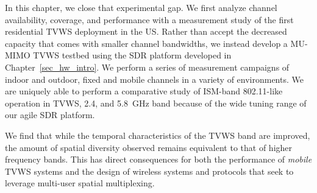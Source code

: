 	In this chapter, we close that experimental gap.
	We first analyze channel availability, coverage, and performance with a measurement study of the first residential \ac{TVWS} deployment in the US.
	Rather than accept the decreased capacity that comes with smaller channel bandwidths, we instead develop a \ac{MU-MIMO} \ac{TVWS} testbed using the \ac{SDR} platform developed in Chapter~\ref{sec_hw_intro}.
	We perform a series of measurement campaigns of indoor and outdoor, fixed and mobile channels in a variety of environments.
	We are uniquely able to perform a comparative study of \ac{ISM}-band 802.11-like operation in \ac{TVWS}, 2.4, and 5.8~GHz band because of the wide tuning range of our agile \ac{SDR} platform.

	We find that while the temporal characteristics of the \ac{TVWS} band are improved, the amount of spatial diversity observed remains equivalent to that of higher frequency bands.
	This has direct consequences for both the performance of \emph{mobile} \ac{TVWS} systems and the design of wireless systems and protocols that seek to leverage multi-user spatial multiplexing.
